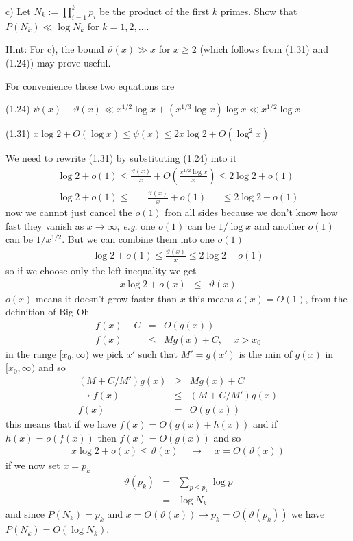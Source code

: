 \documentclass[aps,preprint,preprintnumbers,nofootinbib,showpacs,prd]{revtex4-1}
\newcommand{\eg}{{\it e.g.} }
\newcommand{\nbea}{\begin{eqnarray*}}
\newcommand{\neea}{\end{eqnarray*}}
\begin{document}
c) Let $N_k := \prod_{i=1}^k p_i$ be the product of the first $k$ primes. Show that $P(N_k) \ll \log N_k$ for $k = 1, 2, \dots$.

Hint: For c), the bound $\vartheta(x) \gg x$ for $x \ge 2$ (which follows from (1.31) and (1.24)) may prove useful.

For convenience those two equations are

(1.24) $\psi(x) - \vartheta(x) \ll x^{1/2} \log x + (x^{1/3} \log x) \log x \ll x^{1/2} \log x$

(1.31) $x \log 2 + O(\log x) \le \psi(x) \le 2x \log 2 + O(\log^2 x)$

We need to rewrite (1.31) by substituting (1.24) into it
%
\nbea
\log 2 + o(1) \le \frac{\vartheta(x)}{x} + O\left( \frac{x^{1/2} \log x}{x} \right ) \le 2\log 2 + o(1) \\
\log 2 + o(1) \le ~~~~~~~~ \frac{\vartheta(x)}{x} + o(1) ~~~~~~~ \le 2\log 2 + o(1) 
\neea
%
now we cannot just cancel the $o(1)$ fron all sides because we don't know how fast they vanish as $x\to\infty$, \eg one $o(1)$ can be $1/\log x$ and another $o(1)$ can be $1/x^{1/2}$. But we can combine them into one $o(1)$
%
\nbea
\log 2 + o(1) \le \frac{\vartheta(x)}{x} \le 2\log 2 + o(1) 
\neea
%
so if we choose only the left inequality we get
%
\nbea
x\log 2 + o(x) & \le & \vartheta(x)
\neea
%
$o(x)$ means it doesn't grow faster than $x$ this means $o(x) = O(1)$, from the definition of Big-Oh
%
\nbea
f(x) - C & = & O(g(x)) \\
f(x) & \le & M g(x) + C, ~~~~~ x > x_0
\neea
%
in the range $[x_0, \infty)$ we pick $x'$ such that $M' = g(x')$ is the min of $g(x)$ in $[x_0, \infty)$ and so
%
\nbea
(M + C/M')g(x) & \ge & M g(x) + C \\
\to f(x) & \le & (M + C/M') g(x) \\
f(x) & = & O(g(x))
\neea
%
this means that if we have $f(x) = O(g(x) + h(x))$ and if $h(x) = o(f(x))$ then $f(x) = O(g(x))$ and so
%
\nbea
x\log 2 + o(x) \le \vartheta(x) ~~~~~ \to ~~~~~ x = O(\vartheta(x))
\neea
%
if we now set $x = p_k$
%
\nbea
\vartheta(p_k) & = & \sum_{p \le p_k} \log p \\
& = & \log N_k
\neea
%
and since $P(N_k) = p_k$ and $x = O(\vartheta(x)) \to p_k = O(\vartheta(p_k))$ we have $P(N_k) = O(\log N_k)$.
\end{document}
